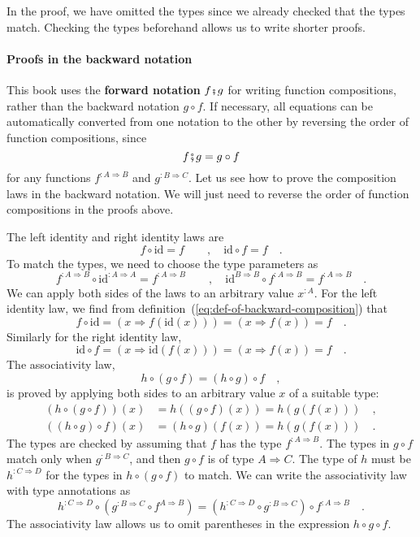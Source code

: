 In the proof, we have omitted the types since we already checked that
the types match. Checking the types beforehand allows us to write
shorter proofs.

\paragraph{Proofs in the backward notation}

This book uses the \textbf{forward notation}
$f\bef g$ for writing function compositions, rather than the backward
notation $g\circ f$. If necessary, all equations can be automatically
converted from one notation to the other by reversing the order of
function compositions, since
\[
f\bef g=g\circ f
\]
for any functions $f^{:A\Rightarrow B}$ and $g^{:B\Rightarrow C}$.
Let us see how to prove the composition laws in the backward notation.
We will just need to reverse the order of function compositions in
the proofs above.

The left identity and right identity laws are
\[
f\circ\text{id}=f\quad\quad,\quad\text{id}\circ f=f\quad.
\]
To match the types, we need to choose the type parameters as
\[
f^{:A\Rightarrow B}\circ\text{id}^{:A\Rightarrow A}=f^{:A\Rightarrow B}\quad\quad,\quad\text{id}^{B\Rightarrow B}\circ f^{:A\Rightarrow B}=f^{:A\Rightarrow B}\quad.
\]
We can apply both sides of the laws to an arbitrary value $x^{:A}$.
For the left identity law, we find from definition~(\ref{eq:def-of-backward-composition})
that
\[
f\circ\text{id}=\left(x\Rightarrow f(\text{id}(x))\right)=\left(x\Rightarrow f(x)\right)=f\quad.
\]
Similarly for the right identity law,
\[
\text{id}\circ f=\left(x\Rightarrow\text{id}\left(f\left(x\right)\right)\right)=\left(x\Rightarrow f\left(x\right)\right)=f\quad.
\]
The associativity law,
\[
h\circ\left(g\circ f\right)=\left(h\circ g\right)\circ f\quad,
\]
is proved by applying both sides to an arbitrary value $x$ of a suitable
type:
\begin{align*}
\left(h\circ\left(g\circ f\right)\right)(x) & =h\left(\left(g\circ f\right)(x)\right)=h\left(g\left(f\left(x\right)\right)\right)\quad,\\
\left(\left(h\circ g\right)\circ f\right)(x) & =\left(h\circ g\right)\left(f(x)\right)=h\left(g\left(f\left(x\right)\right)\right)\quad.
\end{align*}
The types are checked by assuming that $f$ has the type $f^{:A\Rightarrow B}$.
The types in $g\circ f$ match only when $g^{:B\Rightarrow C}$, and
then $g\circ f$ is of type $A\Rightarrow C$. The type of $h$ must
be $h^{:C\Rightarrow D}$ for the types in $h\circ\left(g\circ f\right)$
to match. We can write the associativity law with type annotations
as
\begin{equation}
h^{:C\Rightarrow D}\circ(g^{:B\Rightarrow C}\circ f^{A\Rightarrow B})=(h^{:C\Rightarrow D}\circ g^{:B\Rightarrow C})\circ f^{:A\Rightarrow B}\quad.\label{eq:assoc-law-for-composition-with-types-backward}
\end{equation}
The associativity law allows us to omit parentheses in the expression
$h\circ g\circ f$. 

